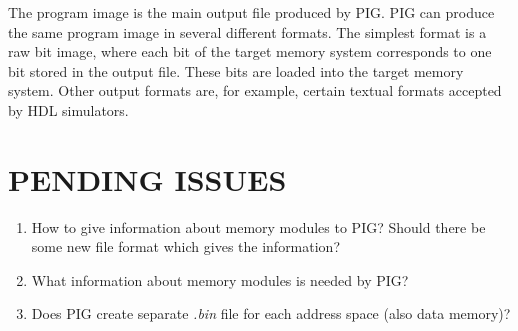 \documentclass[a4paper,twoside]{tce}
\begin{document}
The program image is the main output file produced by PIG. PIG can produce
the same program image in several different formats. The simplest format is
a raw bit image, where each bit of the target memory system corresponds to
one bit stored in the output file.  These bits are loaded into the target
memory system.  Other output formats are, for example, certain textual
formats accepted by HDL simulators.

\chapter{PENDING ISSUES}


\begin{enumerate}
\item
  How to give information about memory modules to PIG? Should there be
  some new file format which gives the information?
\item
  What information about memory modules is needed by PIG?
\item
  Does PIG create separate \emph{.bin} file for each address space
  (also data memory)?
\end{enumerate}



\cleardoublepage

\end{document}

